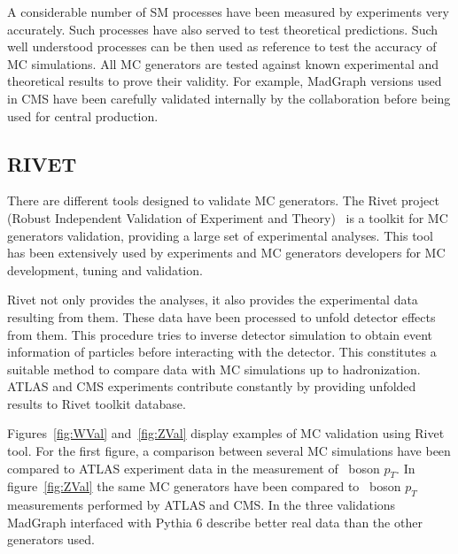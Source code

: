 A considerable number of SM processes have been measured by experiments very accurately. Such processes have also served to test theoretical predictions. Such well understood processes can be then used as reference to test the accuracy of MC simulations. All MC generators are tested against known experimental and theoretical results to prove their validity. For example, MadGraph versions used in CMS have been carefully validated internally by the collaboration before being used for central production.

\subsection{RIVET}
\label{sec:rivet}

There are different tools designed to validate MC generators. The Rivet project (Robust Independent Validation of Experiment and Theory)~\cite{Buckley:2010ar} is a toolkit for MC generators validation, providing a large set of experimental analyses. This tool has been extensively used by experiments and MC generators developers for MC development, tuning and validation. 

Rivet not only provides the analyses, it also provides the experimental data resulting from them. These data have been processed to unfold detector effects from them. This procedure tries to inverse detector simulation to obtain event information of particles before interacting with the detector. This constitutes a suitable method to compare data with MC simulations up to hadronization. ATLAS and CMS experiments contribute constantly by providing unfolded results to Rivet toolkit database.

Figures~\ref{fig:WVal} and~\ref{fig:ZVal} display examples of MC validation using Rivet tool. For the first figure, a comparison between several MC simulations have been compared to ATLAS experiment data in the measurement of \W~boson $p_{T}$. In figure~\ref{fig:ZVal} the same MC generators have been compared to \Z~boson $p_{T}$ measurements performed by ATLAS and CMS. In the three validations MadGraph interfaced with Pythia 6 describe better real data than the other generators used. 

